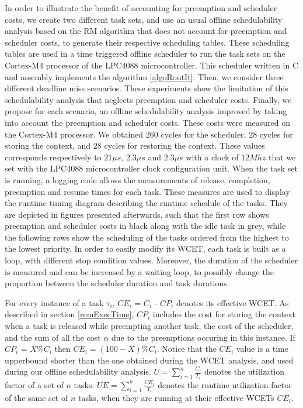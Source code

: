 \documentclass[conference,compsocconf]{IEEEtran}
\begin{document}
In order to illustrate the benefit of accounting for preemption and scheduler costs, we create two different task sets, and use an usual offline schedulability analysis based on the RM algorithm that does not account for preemption and scheduler costs, to generate their respective scheduling tables. These scheduling tables are used in a time triggered offline scheduler to run the task sets on the Cortex-M4 processor of the LPC4088 microcontroller. This scheduler written in C and assembly implements the algorithm \ref{algoRoutIt}. Then, we consider three different deadline miss scenarios. These experiments show the limitation of this schedulability analysis that neglects preemption and scheduler costs. Finally, we propose for each scenario, an offline schedulability analysis improved by taking into account the preemption and scheduler costs. 
These costs were measured on the Cortex-M4 processor. We obtained $260$ cycles for the scheduler, $28$ cycles for storing the context, and $28$ cycles for restoring the context. These values corresponds respectively to $21\mu{s}$, $2.3\mu{s}$ and $2.3\mu{s}$ with a clock of $12Mhz$ that we set with the LPC4088 microcontroller clock configuration unit. When the task set is running, a logging code allows the measurements of release, completion, preemption and resume times for each task. These measures are used to display the runtime timing diagram describing the runtime schedule of the tasks. They are depicted in figures presented afterwards, such that the first row shows preemption and scheduler costs in black along with the idle task in grey, while the following rows show the scheduling of the tasks ordered from the highest to the lowest priority. In order to easily modify its WCET, each task is built as a loop, with different stop condition values. Moreover, the duration of the scheduler is measured and can be increased by a waiting loop, to possibly change the proportion between the scheduler duration and task durations.

For every instance of a task $\tau_i$, $CE_i$ = $C_i$ - $CP_i$ denotes its effective WCET. As described in section \ref{remExecTime}, $CP_i$ includes the cost for storing the context when a task is released while preempting another task, the cost of the scheduler, and the sum of all the cost $\alpha$ due to the preemptions occuring in this instance. If $CP_i$ = $X\%  C_i$ then $CE_i =  (100-X)\%  C_i$. Notice that the $CE_i$ value is a time upperbound shorter than the one obtained during the WCET analysis, and used during our offline schedulability analysis. $U=\sum\limits_{i=1}^n \frac{C_i}{T_i}$ denotes the utilization factor of a set of $n$ tasks. $UE=\sum\limits_{i=1}^n \frac{CE_i}{T_i}$ denotes the runtime utilization factor of the same set of $n$ tasks, when they are running at their effective WCETs $CE_i$.
\end{document}
